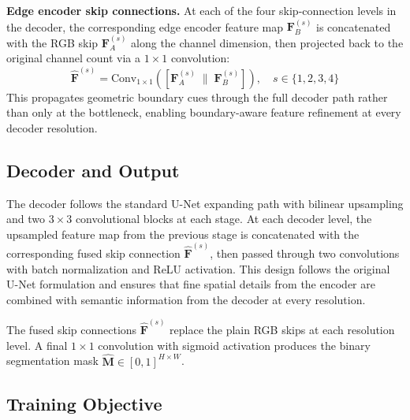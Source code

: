 \textbf{Edge encoder skip connections.} At each of the four skip-connection levels in the decoder, the corresponding edge encoder feature map $\mathbf{F}_B^{(s)}$ is concatenated with the RGB skip $\mathbf{F}_A^{(s)}$ along the channel dimension, then projected back to the original channel count via a $1{\times}1$ convolution:
%
\begin{equation}
  \hat{\mathbf{F}}^{(s)} = \text{Conv}_{1\times1}\!\left(\left[\mathbf{F}_A^{(s)} \;\|\; \mathbf{F}_B^{(s)}\right]\right), \quad s \in \{1,2,3,4\}
\end{equation}
%
This propagates geometric boundary cues through the full decoder path rather than only at the bottleneck, enabling boundary-aware feature refinement at every decoder resolution.

\subsection{Decoder and Output}

The decoder follows the standard U-Net expanding path with bilinear upsampling and two $3{\times}3$ convolutional blocks at each stage. At each decoder level, the upsampled feature map from the previous stage is concatenated with the corresponding fused skip connection $\hat{\mathbf{F}}^{(s)}$, then passed through two convolutions with batch normalization and ReLU activation. This design follows the original U-Net formulation and ensures that fine spatial details from the encoder are combined with semantic information from the decoder at every resolution.

The fused skip connections $\hat{\mathbf{F}}^{(s)}$ replace the plain RGB skips at each resolution level. A final $1{\times}1$ convolution with sigmoid activation produces the binary segmentation mask $\hat{\mathbf{M}} \in [0,1]^{H \times W}$.

\subsection{Training Objective}


